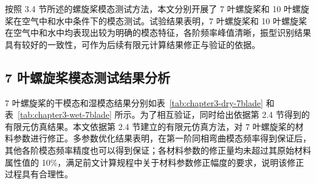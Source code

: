 按照 3.4 节所述的螺旋桨模态测试方法，本文分别开展了 7 叶螺旋桨和 10 叶螺旋桨在空气中和水中条件下的模态测试。试验结果表明，7 叶螺旋桨和 10 叶螺旋桨在空气中和水中均表现出较为明确的模态特征，各阶频率峰值清晰，振型识别结果具有较好的一致性，可作为后续有限元计算结果修正与验证的依据。

\subsection{7 叶螺旋桨模态测试结果分析}

7 叶螺旋桨的干模态和湿模态结果分别如表~\ref{tab:chapter3-dry-7blade} 和表~\ref{tab:chapter3-wet-7blade} 所示。为了相互验证，同时给出依据第 2.4 节得到的有限元仿真结果。本文依据第 2.4 节建立的有限元仿真方法，对 7 叶螺旋桨的材料参数进行修正。多参数优化结果表明，在第一阶同相弯曲模态频率得到保证后，其他各阶模态频率精度也可以得到保证；各材料参数的修正量均未超过其原始材料属性值的 10\%，满足前文计算规程中关于材料参数修正幅度的要求，说明该修正过程具有合理性。

\newcommand{\chapterthreetablefontA}{\fontsize{14.30bp}{17.16bp}\selectfont}
\newcommand{\chapterthreetablefontB}{\fontsize{11.57bp}{13.88bp}\selectfont}

